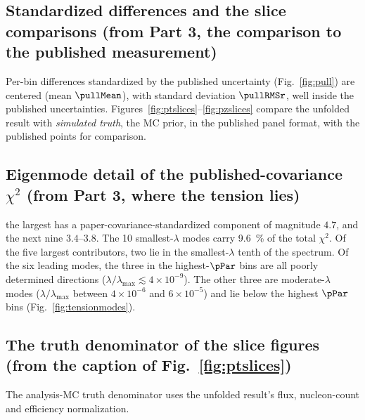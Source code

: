 \subsection{Standardized differences and the slice comparisons (from Part 3, the comparison to the published measurement)}
Per-bin differences standardized by the published uncertainty (Fig.~\ref{fig:pull}) are centered (mean $\pullMean$), with standard deviation $\pullRMSr$, well inside the published uncertainties. Figures~\ref{fig:ptslices}--\ref{fig:pzslices} compare the unfolded result with \emph{simulated truth}, the MC prior, in the published panel format, with the published points for comparison.

\subsection{Eigenmode detail of the published-covariance $\chi^{2}$ (from Part 3, where the tension lies)}
the largest has a paper-covariance-standardized component of magnitude $4.7$, and the next nine $3.4$--$3.8$. The 10 smallest-$\lambda$ modes carry \SI{9.6}{\percent} of the total $\chi^{2}$. Of the five largest contributors, two lie in the smallest-$\lambda$ tenth of the spectrum.
Of the six leading modes, the three in the highest-$\pPar$ bins are all poorly determined directions ($\lambda/\lambda_{\max}\lesssim4\times10^{-9}$). The other three are moderate-$\lambda$ modes ($\lambda/\lambda_{\max}$ between $4\times10^{-6}$ and $6\times10^{-5}$) and lie below the highest $\pPar$ bins (Fig.~\ref{fig:tensionmodes}).

\subsection{The truth denominator of the slice figures (from the caption of Fig.~\ref{fig:ptslices})}
The analysis-MC truth denominator uses the unfolded result's flux, nucleon-count and efficiency normalization.

